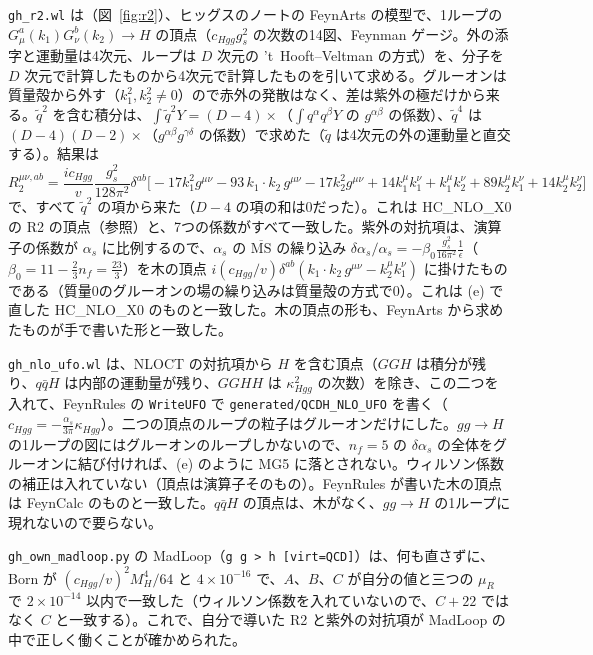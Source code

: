 \documentclass[a4paper,10pt]{ltjsarticle}
\newcommand{\MSbar}{\overline{\mathrm{MS}}}
\begin{document}
\texttt{gh\_r2.wl} は（図~\ref{fig:r2}）、ヒッグスのノートの FeynArts の模型で、1ループの $G^a_\mu(k_1)G^b_\nu(k_2)\to H$ の頂点（$c_{Hgg}g_s^2$ の次数の14図、Feynman ゲージ。外の添字と運動量は4次元、ループは $D$ 次元の 't~Hooft--Veltman の方式）を、分子を $D$ 次元で計算したものから4次元で計算したものを引いて求める。グルーオンは質量殻から外す（$k_1^2,k_2^2\neq0$）ので赤外の発散はなく、差は紫外の極だけから来る。$\tilde q^2$ を含む積分は、$\int\tilde q^2Y=(D-4)\times$（$\int q^\alpha q^\beta Y$ の $g^{\alpha\beta}$ の係数）、$\tilde q^4$ は $(D-4)(D-2)\times$（$g^{\alpha\beta}g^{\gamma\delta}$ の係数）で求めた（$\tilde q$ は4次元の外の運動量と直交する）。結果は
\begin{equation}
R_2^{\mu\nu,ab}=\frac{ic_{Hgg}}v\frac{g_s^2}{128\pi^2}\delta^{ab}\bigl[-17k_1^2g^{\mu\nu}-93\,k_1\!\cdot\!k_2\,g^{\mu\nu}-17k_2^2g^{\mu\nu}+14k_1^\mu k_1^\nu+k_1^\mu k_2^\nu+89k_2^\mu k_1^\nu+14k_2^\mu k_2^\nu\bigr]
\label{eq:r2ggh}
\end{equation}
で、すべて $\tilde q^2$ の項から来た（$D-4$ の項の和は0だった）。これは HC\_NLO\_X0 の R2 の頂点（参照）と、7つの係数がすべて一致した。紫外の対抗項は、演算子の係数が $\alpha_s$ に比例するので、$\alpha_s$ の $\MSbar$ の繰り込み $\delta\alpha_s/\alpha_s=-\beta_0\frac{g_s^2}{16\pi^2}\frac1\epsilon$（$\beta_0=11-\frac23n_f=\frac{23}3$）を木の頂点 $i(c_{Hgg}/v)\delta^{ab}(k_1\!\cdot\!k_2\,g^{\mu\nu}-k_2^\mu k_1^\nu)$ に掛けたものである（質量0のグルーオンの場の繰り込みは質量殻の方式で0）。これは (e) で直した HC\_NLO\_X0 のものと一致した。木の頂点の形も、FeynArts から求めたものが手で書いた形と一致した。

\texttt{gh\_nlo\_ufo.wl} は、NLOCT の対抗項から $H$ を含む頂点（$GGH$ は積分が残り、$q\bar qH$ は内部の運動量が残り、$GGHH$ は $\kappa_{Hgg}^2$ の次数）を除き、この二つを入れて、FeynRules の \texttt{WriteUFO} で \texttt{generated/QCDH\_NLO\_UFO} を書く（$c_{Hgg}=-\frac{\alpha_s}{3\pi}\kappa_{Hgg}$）。二つの頂点のループの粒子はグルーオンだけにした。$gg\to H$ の1ループの図にはグルーオンのループしかないので、$n_f=5$ の $\delta\alpha_s$ の全体をグルーオンに結び付ければ、(e) のように MG5 に落とされない。ウィルソン係数の補正は入れていない（頂点は演算子そのもの）。FeynRules が書いた木の頂点は FeynCalc のものと一致した。$q\bar qH$ の頂点は、木がなく、$gg\to H$ の1ループに現れないので要らない。

\texttt{gh\_own\_madloop.py} の MadLoop（\texttt{g g > h [virt=QCD]}）は、何も直さずに、Born が $(c_{Hgg}/v)^2M_H^4/64$ と $4\times10^{-16}$ で、$A$、$B$、$C$ が自分の値と三つの $\mu_R$ で $2\times10^{-14}$ 以内で一致した（ウィルソン係数を入れていないので、$C+22$ ではなく $C$ と一致する）。これで、自分で導いた R2 と紫外の対抗項が MadLoop の中で正しく働くことが確かめられた。
\end{document}
